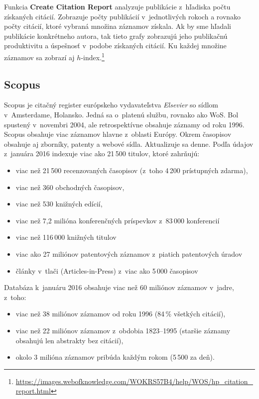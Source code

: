 Funkcia \textbf{Create Citation Report} analyzuje publikácie z~hľadiska počtu
získaných citácií.  Zobrazuje počty publikácií v~jednotlivých rokoch a rovnako
počty citácií, ktoré vybraná množina záznamov získala.  Ak by sme hľadali
publikácie konkrétneho autora, tak tieto grafy zobrazujú jeho publikačnú
produktivitu a úspešnosť v~podobe získaných citácií.  Ku každej množine záznamov
sa zobrazí aj
$h$-index.\footnote{\url{https://images.webofknowledge.com/WOKRS57B4/help/WOS/hp_citation_report.html}}


\subsection{Scopus}

Scopus je citačný register európskeho vydavateľstva \emph{Elsevier} so sídlom
v~Amsterdame, Holansko.  Jedná sa o~platenú službu, rovnako ako WoS.  Bol
spustený v~novembri 2004, ale retrospektívne obsahuje záznamy od roku 1996.
Scopus obsahuje viac záznamov hlavne z~oblasti Európy.  Okrem časopisov obsahuje
aj zborníky, patenty a webové sídla.  Aktualizuje sa denne.  Podľa údajov
z~januára 2016 indexuje viac ako 21\,500 titulov, ktoré zahrňujú:

\begin{itemize}
\item viac než 21\,500 recenzovaných časopisov (z~toho 4\,200 prístupných
  zdarma),
\item viac než 360 obchodných časopisov,
\item viac než 530 knižných edícií,
\item viac než 7,2 milióna konferenčných príspevkov z~83\,000 konferencií
\item viac než 116\,000 knižných titulov 
\item viac ako 27 miliónov patentových záznamov z~piatich patentových úradov
\item články v~tlači (Articles-in-Press) z~viac ako 5\,000 časopisov
\end{itemize}

Databáza k~januáru 2016 obsahuje viac než 60 miliónov záznamov v~jadre, z~toho:

\begin{itemize}
\item viac než 38 miliónov záznamov od roku 1996 (84\,\% všetkých citácií),
\item viac než 22 miliónov záznamov z~obdobia 1823--1995 (staršie záznamy
  obsahujú len abstrakty bez citácií),
\item okolo 3 milióna záznamov pribúda každým rokom (5\,500 za deň).
\end{itemize}

